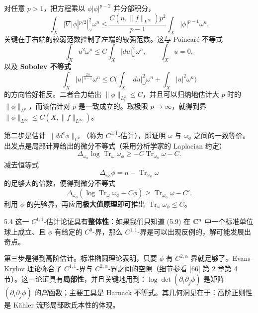 
对任意 $p>1$，把方程乘以 $\phi|\phi|^{p-2}$ 并分部积分，
\[
\int_X|\nabla|\phi|^{p/2}|_\omega^2\omega^n \le \frac{C(n,\|f\|_{L^\infty})p^2}{p-1}\int_X|\phi|^{p-1}\omega^n.
\]
关键在于右端的较弱范数控制了左端的较强范数。这与 Poincaré 不等式
\[
\int_X u^2\omega^n\le C\int_X|du|_\omega^2\omega^n,\qquad \int_X u=0,
\]
以及 \textbf{Sobolev 不等式}
\[
\int_X|u|^{\frac{2n}{n-1}}\omega^n\le C\Big(\int_X|du|_\omega^2\omega^n+\int_X|u|^2\omega^n\Big)
\]
的方向恰好相反。二者合力给出 $\|\phi\|_{L^2_1}\le C$，并且可以归纳地估计大 $p$ 时的 $\|\phi\|_{L^p}$，而该估计对 $p$ 是一致成立的。取极限 $p\to\infty$，就得到界 $\|\phi\|_{L^\infty}\le C(X,\|f\|_{L^\infty})$。


第二步是估计 $\|dd^c\phi\|_{C^0}$（称为 $C^{1,\bar1}$-估计），即证明 $\omega$ 与 $\omega_\phi$ 之间的一致等价。出发点是局部计算给出的微分不等式（采用分析学家的 Laplacian 约定）
\[
\Delta_{\omega_\phi}\log\operatorname{Tr}_\omega\omega_\phi\ge -C\operatorname{Tr}_{\omega_\phi}\omega-C.
\]
减去恒等式
\[
\Delta_{\omega_\phi}\phi = n-\operatorname{Tr}_{\omega_\phi}\omega
\]
的足够大的倍数，便得到微分不等式
\[
\Delta_{\omega_\phi}(\log\operatorname{Tr}_\omega\omega_\phi-C\phi)\ge \operatorname{Tr}_{\omega_\phi}\omega-C'.
\]
利用 $\phi$ 的先验界，再应用\textbf{极大值原理}即可推出 $\operatorname{Tr}_\omega\omega_\phi\le C$。


\begin{remark}{5.4}
这一 $C^{1,\bar1}$-估计论证具有\textbf{整体性}：如果我们只知道 (5.9) 在 $\mathbb{C}^n$ 中一个标准单位球上成立、且 $\phi$ 有给定的 $C^0$-界，那么 $C^{1,\bar1}$-界是可以出现反例的，解可能发展出奇点。
\end{remark}

第三步是得到高阶估计。标准椭圆理论表明，只要 $\phi$ 有 $C^{2,\alpha}$ 界就足够了。Evans--Krylov 理论弥合了 $C^{1,\bar1}$-界与 $C^{2,\alpha}$-界之间的空隙（细节参看 [66] 第 2 章第 4 节）。这一论证具有\textbf{局部性}，并且关键地用到：$\log\det(\partial_i\partial_{\bar j}\phi)$ 是矩阵 $(\partial_i\partial_{\bar j}\phi)$ 的\emph{凹}函数；主要工具是 Harnack 不等式。其几何洞见在于：高阶正则性是 Kähler 流形局部欧氏本性的体现。

